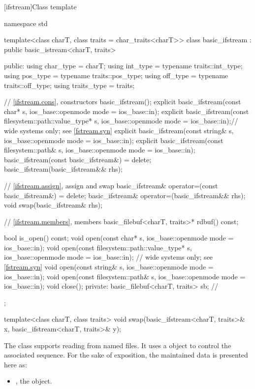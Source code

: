 [ifstream]{Class template }

%
\begin{codeblock}
namespace std {
  template<class charT, class traits = char_traits<charT>>
  class basic_ifstream : public basic_istream<charT, traits> {
  public:
    using char_type   = charT;
    using int_type    = typename traits::int_type;
    using pos_type    = typename traits::pos_type;
    using off_type    = typename traits::off_type;
    using traits_type = traits;

    // \ref{ifstream.cons}, constructors
    basic_ifstream();
    explicit basic_ifstream(const char* s,
                            ios_base::openmode mode = ios_base::in);
    explicit basic_ifstream(const filesystem::path::value_type* s,
                            ios_base::openmode mode = ios_base::in);// wide systems only; see \ref{fstream.syn}
    explicit basic_ifstream(const string& s,
                            ios_base::openmode mode = ios_base::in);
    explicit basic_ifstream(const filesystem::path& s,
                            ios_base::openmode mode = ios_base::in);
    basic_ifstream(const basic_ifstream&) = delete;
    basic_ifstream(basic_ifstream&& rhs);

    // \ref{ifstream.assign}, assign and swap
    basic_ifstream& operator=(const basic_ifstream&) = delete;
    basic_ifstream& operator=(basic_ifstream&& rhs);
    void swap(basic_ifstream& rhs);

    // \ref{ifstream.members}, members
    basic_filebuf<charT, traits>* rdbuf() const;

    bool is_open() const;
    void open(const char* s, ios_base::openmode mode = ios_base::in);
    void open(const filesystem::path::value_type* s,
              ios_base::openmode mode = ios_base::in);  // wide systems only; see \ref{fstream.syn}
    void open(const string& s, ios_base::openmode mode = ios_base::in);
    void open(const filesystem::path& s, ios_base::openmode mode = ios_base::in);
    void close();
  private:
    basic_filebuf<charT, traits> sb;    // \expos
  };

  template<class charT, class traits>
    void swap(basic_ifstream<charT, traits>& x,
              basic_ifstream<charT, traits>& y);
}
\end{codeblock}

\pnum
The class
supports reading from named files.
It uses a
object to control the associated
sequence.
For the sake of exposition, the maintained data is presented here as:
\begin{itemize}
\item
{}, the  object.
\end{itemize}

